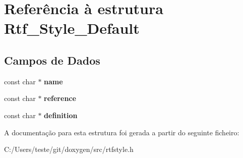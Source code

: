\hypertarget{struct_rtf___style___default}{\section{Referência à estrutura Rtf\-\_\-\-Style\-\_\-\-Default}
\label{struct_rtf___style___default}
}
\subsection*{Campos de Dados}
\begin{DoxyCompactItemize}
\item 
\hypertarget{struct_rtf___style___default_a8f8f80d37794cde9472343e4487ba3eb}{const char $\ast$ {\bfseries name}}\label{struct_rtf___style___default_a8f8f80d37794cde9472343e4487ba3eb}

\item 
\hypertarget{struct_rtf___style___default_aa1cf7f20469dfe9d217f05ecfd4695ea}{const char $\ast$ {\bfseries reference}}\label{struct_rtf___style___default_aa1cf7f20469dfe9d217f05ecfd4695ea}

\item 
\hypertarget{struct_rtf___style___default_ae675b179d66ffb773ff0d8bce3266d38}{const char $\ast$ {\bfseries definition}}\label{struct_rtf___style___default_ae675b179d66ffb773ff0d8bce3266d38}

\end{DoxyCompactItemize}


A documentação para esta estrutura foi gerada a partir do seguinte ficheiro\-:\begin{DoxyCompactItemize}
\item 
C\-:/\-Users/teste/git/doxygen/src/rtfstyle.\-h\end{DoxyCompactItemize}
